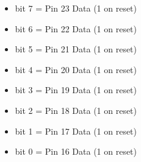 \begin{itemize}
\item bit 7 = Pin 23 Data (1 on reset)
\item bit 6 = Pin 22 Data (1 on reset)
\item bit 5 = Pin 21 Data (1 on reset)
\item bit 4 = Pin 20 Data (1 on reset)
\item bit 3 = Pin 19 Data (1 on reset)
\item bit 2 = Pin 18 Data (1 on reset)
\item bit 1 = Pin 17 Data (1 on reset)
\item bit 0 = Pin 16 Data (1 on reset)
\end{itemize}

